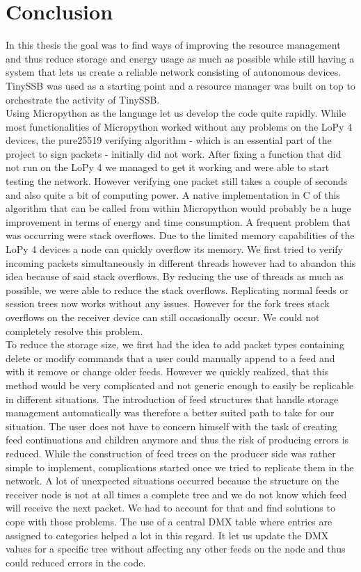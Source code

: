 \chapter{Conclusion}
In this thesis the goal was to find ways of improving the resource management and thus reduce storage and energy usage as much as possible while still having a system that lets us create a reliable network consisting of autonomous devices. TinySSB was used as a starting point and a resource manager was built on top to orchestrate the activity of TinySSB. \\
Using Micropython as the language let us develop the code quite rapidly. While most functionalities of Micropython worked without any problems on the LoPy 4 devices, the pure25519 verifying algorithm - which is an essential part of the project to sign packets - initially did not work. After fixing a function that did not run on the LoPy 4 we managed to get it working and were able to start testing the network. However verifying one packet still takes a couple of seconds and also quite a bit of computing power. A native implementation in C of this algorithm that can be called from within Micropython would probably be a huge improvement in terms of energy and time consumption. A frequent problem that was occurring were stack overflows. Due to the limited memory capabilities of the LoPy 4 devices a node can quickly overflow its memory. We first tried to verify incoming packets simultaneously in different threads however had to abandon this idea because of said stack overflows. By reducing the use of threads as much as possible, we were able to reduce the stack overflows. Replicating normal feeds or session trees now works without any issues. However for the fork trees stack overflows on the receiver device can still occasionally occur. We could not completely resolve this problem. \\
To reduce the storage size, we first had the idea to add packet types containing delete or modify commands that a user could manually append to a feed and with it remove or change older feeds. However we quickly realized, that this method would be very complicated and not generic enough to easily be replicable in different situations. The introduction of feed structures that handle storage management automatically was therefore a better suited path to take for our situation. The user does not have to concern himself with the task of creating feed continuations and children anymore and thus the risk of producing errors is reduced. While the construction of feed trees on the producer side was rather simple to implement, complications started once we tried to replicate them in the network. A lot of unexpected situations occurred because the structure on the receiver node is not at all times a complete tree and we do not know which feed will receive the next packet. We had to account for that and find solutions to cope with those problems. The use of a central DMX table where entries are assigned to categories helped a lot in this regard. It let us update the DMX values for a specific tree without affecting any other feeds on the node and thus could reduced errors in the code. \\
